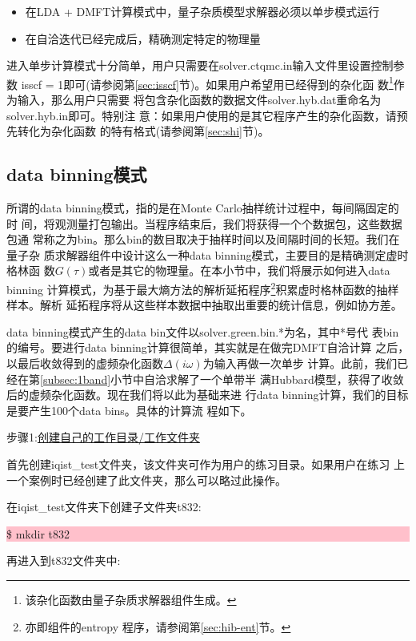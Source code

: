 \begin{itemize}
\item 在LDA + DMFT计算模式中，量子杂质模型求解器必须以单步模式运行
\item 在自洽迭代已经完成后，精确测定特定的物理量
\end{itemize}

进入单步计算模式十分简单，用户只需要在solver.ctqmc.in输入文件里设置控制参数
isscf = 1即可(请参阅第\ref{sec:isscf}节)。如果用户希望用已经得到的杂化函
数\footnote{该杂化函数由量子杂质求解器组件生成。}作为输入，那么用户只需要
将包含杂化函数的数据文件solver.hyb.dat重命名为solver.hyb.in即可。特别注
意：如果用户使用的是其它程序产生的杂化函数，请预先转化为{\iqist}杂化函数
的特有格式(请参阅第\ref{sec:shi}节)。

\subsection{data binning模式}
\label{subsec:binning}

所谓的data binning模式，指的是在Monte Carlo抽样统计过程中，每间隔固定的时
间，将观测量打包输出。当程序结束后，我们将获得一个个数据包，这些数据包通
常称之为bin。那么bin的数目取决于抽样时间以及间隔时间的长短。我们在量子杂
质求解器组件中设计这么一种data binning模式，主要目的是精确测定虚时格林函
数$G(\tau)$或者是其它的物理量。在本小节中，我们将展示如何进入data binning
计算模式，为基于最大熵方法的解析延拓程序\footnote{亦即{\hibiscus}组件的entropy
程序，请参阅第\ref{sec:hib-ent}节。}积累虚时格林函数的抽样样本。解析
延拓程序将从这些样本数据中抽取出重要的统计信息，例如协方差。

data binning模式产生的data bin文件以solver.green.bin.*为名，其中*号代
表bin的编号。要进行data binning计算很简单，其实就是在做完DMFT自洽计算
之后，以最后收敛得到的虚频杂化函数$\Delta(i\omega)$为输入再做一次单步
计算。此前，我们已经在第\ref{subsec:1band}小节中自洽求解了一个单带半
满Hubbard模型，获得了收敛后的虚频杂化函数。现在我们将以此为基础来进
行data binning计算，我们的目标是要产生100个data bins。具体的计算流
程如下。

步骤1:\underline{创建自己的工作目录/工作文件夹}

首先创建iqist\_test文件夹，该文件夹可作为用户的练习目录。如果用户在练习
上一个案例时已经创建了此文件夹，那么可以略过此操作。

在iqist\_test文件夹下创建子文件夹t832:

\noindent\colorbox{pink}{\parbox[r]{\linewidth}{\quad \$ mkdir t832 }}

再进入到t832文件夹中:

